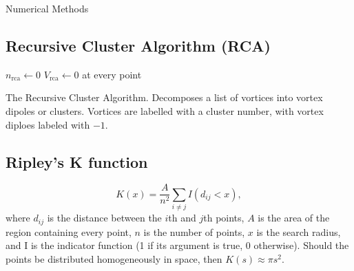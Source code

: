 \begin{chapter}{\label{cha:numerics}Numerical Methods}
	\subsection{\label{section:reevesalgorithm} Recursive Cluster Algorithm (RCA) }
		\begin{algorithm}[H]
		\BlankLine
		$n_{\mathrm{rca}}\leftarrow0$\;
		$V_{\mathrm{rca}}\leftarrow 0$ at every point\;

		\caption{The Recursive Cluster Algorithm. Decomposes a list of vortices into vortex dipoles or clusters. Vortices are labelled with a cluster number, with vortex diploes labeled with $-1$.}\label{algo_vortexkiller}
		\end{algorithm}


	\subsection{\label{section:ripleysk} Ripley's K function }
		\begin{equation}\label{eq:ripleysk}
		K(x) = \frac{A}{n^2}\sum\limits_{i \ne j} I\left (d_{ij}<x\right ),
		\end{equation}
		where $d_{ij}$ is the distance between the $i$th and $j$th points, $A$ is the area of the region containing every point, $n$ is the number of points, $x$ is the search radius, and I is the indicator function (1 if its argument is true, 0 otherwise). Should the points be distributed homogeneously in space, then $K(s)\approx\pi s^2$.

\end{chapter}
